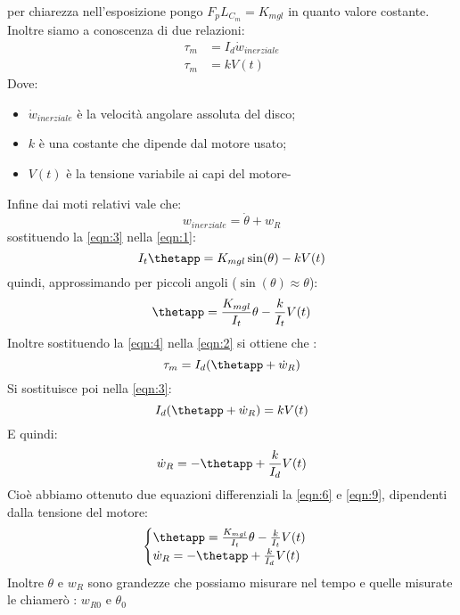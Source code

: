 \documentclass[12pt,a4paper,twoside, openright]{scrartcl}
\newcommand{\thetap}{\dot{\theta}}
\begin{document}
	per chiarezza nell'esposizione pongo $F_p L_{C_m}=K_{mgl}$ in quanto valore costante.
	Inoltre siamo a conoscenza di due relazioni:
	 \begin{align}
	 	\tau_m &=I_d \dot{w}_{inerziale} \label{eqn:2} \\
	 	\tau_m &=kV(t) \label{eqn:3}
	 \end{align}
	Dove:
	\begin{itemize}
			\item $\dot{w}_{inerziale}$ è la velocità angolare assoluta del disco;
			\item $k$ è una costante che dipende dal motore usato;
			\item $V(t)$ è la tensione variabile ai capi del motore-
	\end{itemize}
	Infine dai moti relativi vale che:
	\begin{equation}
		\label{eqn:4}
			w_{inerziale}=\thetap+w_R 
	\end{equation}
	sostituendo la \ref{eqn:3} nella \ref{eqn:1}:
	\begin{equation}
		\label{eqn:5}
	 		I_t\thetapp=K_{mgl}\sin(\theta)-kV(t)
	\end{equation}
	quindi, approssimando per piccoli angoli ($\sin(\theta)\approx \theta$):
	\begin{equation}
		\label{eqn:6}
	 		\thetapp=\frac{K_{mgl}}{I_t}\theta-\frac{k}{I_t}V(t)
	\end{equation}
 	Inoltre sostituendo la \ref{eqn:4} nella \ref{eqn:2} si ottiene che :
	\begin{equation}
		\label{eqn:7}
			\tau_m =I_d(\thetapp+\dot w_R) 
	\end{equation}
	Si sostituisce poi nella \ref{eqn:3}:
	\begin{equation}
		\label{eqn:8}
			I_d(\thetapp+\dot w_R)=kV(t) 
	\end{equation}
	E quindi:
	\begin{equation}
		\label{eqn:9}
			\dot w_R=-\thetapp+\frac{k}{I_d}V(t) 
	\end{equation}
Cioè abbiamo ottenuto due equazioni differenziali la \ref{eqn:6} e \ref{eqn:9}, dipendenti dalla tensione del motore:
	\begin{equation}
		\label{sis:1}
			\begin{cases}
				\thetapp=\frac{K_{mgl}}{I_t}\theta-\frac{k}{I_t}V(t)\\
				\dot w_R=-\thetapp+\frac{k}{I_d}V(t) 
			\end{cases}
	\end{equation}
Inoltre $\theta$ e $w_R$ sono grandezze che possiamo misurare nel tempo e quelle misurate le chiamerò : $w_{R0}$ e $\theta_0$
\end{document}
